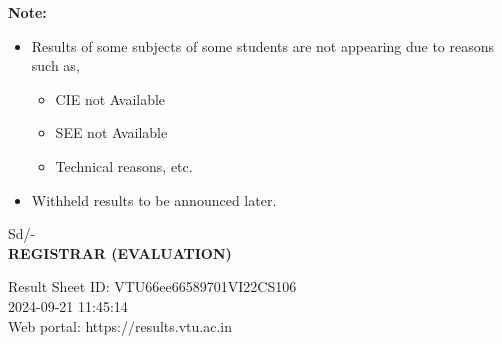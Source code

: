 \documentclass[a4paper,12pt]{article}
\begin{document}
\vspace{0.5cm}

\noindent
\textbf{Note:}
\begin{itemize}
    \item Results of some subjects of some students are not appearing due to reasons such as, 
    \begin{itemize}
        \item CIE not Available
        \item SEE not Available
        \item Technical reasons, etc.
    \end{itemize}
    \item Withheld results to be announced later.
\end{itemize}

\vfill

\begin{flushright}
    Sd/- \\
    \textbf{REGISTRAR (EVALUATION)}
\end{flushright}

\vspace{0.5cm}

\noindent
Result Sheet ID: VTU66ee66589701VI22CS106 \\
2024-09-21 11:45:14 \\
Web portal: https://results.vtu.ac.in
\end{document}
